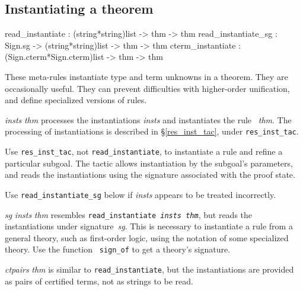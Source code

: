\subsection{Instantiating a theorem}
\begin{ttbox}
read_instantiate    :            (string*string)list -> thm -> thm
read_instantiate_sg : Sign.sg -> (string*string)list -> thm -> thm
cterm_instantiate   :    (Sign.cterm*Sign.cterm)list -> thm -> thm
\end{ttbox}
These meta-rules instantiate type and term unknowns in a theorem.  They are
occasionally useful.  They can prevent difficulties with higher-order
unification, and define specialized versions of rules.
\begin{ttdescription}
\item[\ttindexbold{read_instantiate} {\it insts} {\it thm}] 
processes the instantiations {\it insts} and instantiates the rule~{\it
thm}.  The processing of instantiations is described
in \S\ref{res_inst_tac}, under {\tt res_inst_tac}.  

Use {\tt res_inst_tac}, not {\tt read_instantiate}, to instantiate a rule
and refine a particular subgoal.  The tactic allows instantiation by the
subgoal's parameters, and reads the instantiations using the signature
associated with the proof state.

Use {\tt read_instantiate_sg} below if {\it insts\/} appears to be treated
incorrectly.

\item[\ttindexbold{read_instantiate_sg} {\it sg} {\it insts} {\it thm}]
  resembles \hbox{\tt read_instantiate {\it insts} {\it thm}}, but reads
  the instantiations under signature~{\it sg}.  This is necessary to
  instantiate a rule from a general theory, such as first-order logic,
  using the notation of some specialized theory.  Use the function {\tt
    sign_of} to get a theory's signature.

\item[\ttindexbold{cterm_instantiate} {\it ctpairs} {\it thm}] 
is similar to {\tt read_instantiate}, but the instantiations are provided
as pairs of certified terms, not as strings to be read.
\end{ttdescription}


